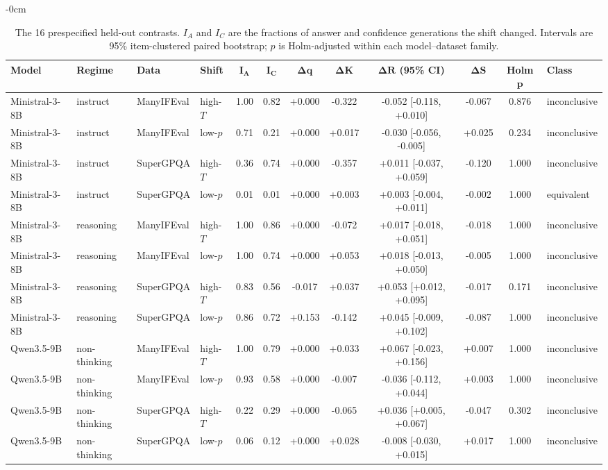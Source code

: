 \begin{table}[H]
\begin{adjustwidth}{-\extralength}{0cm}
\footnotesize
\caption{The 16 prespecified held-out contrasts. $I_A$ and $I_C$ are the fractions of answer and confidence generations the shift changed. Intervals are 95\% item-clustered paired bootstrap; $p$ is Holm-adjusted within each model--dataset family.\label{tab:contrasts}}
\begin{tabular}{llllcccccccl}
\toprule
\textbf{Model} & \textbf{Regime} & \textbf{Data} & \textbf{Shift} & $\boldsymbol{I_A}$ & $\boldsymbol{I_C}$ & $\boldsymbol{\Delta q}$ & $\boldsymbol{\Delta K}$ & $\boldsymbol{\Delta R}$ \textbf{(95\% CI)} & $\boldsymbol{\Delta S}$ & \textbf{Holm} $\boldsymbol{p}$ & \textbf{Class} \\
\midrule
Ministral-3-8B & instruct & ManyIFEval & high-$T$ & 1.00 & 0.82 & +0.000 & -0.322 & -0.052 [-0.118, +0.010] & -0.067 & 0.876 & inconclusive \tabularnewline
Ministral-3-8B & instruct & ManyIFEval & low-$p$ & 0.71 & 0.21 & +0.000 & +0.017 & -0.030 [-0.056, -0.005] & +0.025 & 0.234 & inconclusive \tabularnewline
Ministral-3-8B & instruct & SuperGPQA & high-$T$ & 0.36 & 0.74 & +0.000 & -0.357 & +0.011 [-0.037, +0.059] & -0.120 & 1.000 & inconclusive \tabularnewline
Ministral-3-8B & instruct & SuperGPQA & low-$p$ & 0.01 & 0.01 & +0.000 & +0.003 & +0.003 [-0.004, +0.011] & -0.002 & 1.000 & equivalent \tabularnewline
Ministral-3-8B & reasoning & ManyIFEval & high-$T$ & 1.00 & 0.86 & +0.000 & -0.072 & +0.017 [-0.018, +0.051] & -0.018 & 1.000 & inconclusive \tabularnewline
Ministral-3-8B & reasoning & ManyIFEval & low-$p$ & 1.00 & 0.74 & +0.000 & +0.053 & +0.018 [-0.013, +0.050] & -0.005 & 1.000 & inconclusive \tabularnewline
Ministral-3-8B & reasoning & SuperGPQA & high-$T$ & 0.83 & 0.56 & -0.017 & +0.037 & +0.053 [+0.012, +0.095] & -0.017 & 0.171 & inconclusive \tabularnewline
Ministral-3-8B & reasoning & SuperGPQA & low-$p$ & 0.86 & 0.72 & +0.153 & -0.142 & +0.045 [-0.009, +0.102] & -0.087 & 1.000 & inconclusive \tabularnewline
Qwen3.5-9B & non-thinking & ManyIFEval & high-$T$ & 1.00 & 0.79 & +0.000 & +0.033 & +0.067 [-0.023, +0.156] & +0.007 & 1.000 & inconclusive \tabularnewline
Qwen3.5-9B & non-thinking & ManyIFEval & low-$p$ & 0.93 & 0.58 & +0.000 & -0.007 & -0.036 [-0.112, +0.044] & +0.003 & 1.000 & inconclusive \tabularnewline
Qwen3.5-9B & non-thinking & SuperGPQA & high-$T$ & 0.22 & 0.29 & +0.000 & -0.065 & +0.036 [+0.005, +0.067] & -0.047 & 0.302 & inconclusive \tabularnewline
Qwen3.5-9B & non-thinking & SuperGPQA & low-$p$ & 0.06 & 0.12 & +0.000 & +0.028 & -0.008 [-0.030, +0.015] & +0.017 & 1.000 & inconclusive \tabularnewline

\end{tabular}
\end{adjustwidth}
\end{table}
